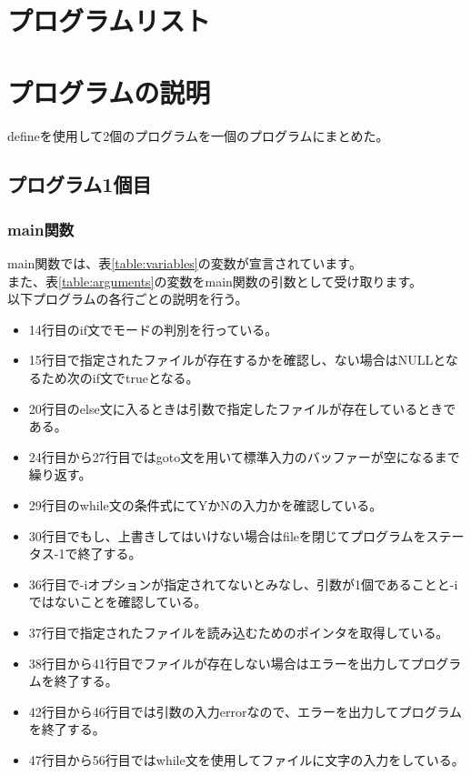 \documentclass[dvipdfmx]{jsarticle}
\begin{document}
\section{プログラムリスト}


\section{プログラムの説明}
defineを使用して2個のプログラムを一個のプログラムにまとめた。
\subsection{プログラム1個目}

\subsubsection{main関数}
main関数では、表\ref{table:variables}の変数が宣言されています。\\
また、表\ref{table:arguments}の変数をmain関数の引数として受け取ります。\\
以下プログラムの各行ごとの説明を行う。
\begin{itemize}
  \item 14行目のif文でモードの判別を行っている。
  \item 15行目で指定されたファイルが存在するかを確認し、ない場合はNULLとなるため次のif文でtrueとなる。
  \item 20行目のelse文に入るときは引数で指定したファイルが存在しているときである。
  \item 24行目から27行目ではgoto文を用いて標準入力のバッファーが空になるまで繰り返す。
  \item 29行目のwhile文の条件式にてYかNの入力かを確認している。
  \item 30行目でもし、上書きしてはいけない場合はfileを閉じてプログラムをステータス-1で終了する。
  \item 36行目で-iオプションが指定されてないとみなし、引数が1個であることと-iではないことを確認している。
  \item 37行目で指定されたファイルを読み込むためのポインタを取得している。
  \item 38行目から41行目でファイルが存在しない場合はエラーを出力してプログラムを終了する。
  \item 42行目から46行目では引数の入力errorなので、エラーを出力してプログラムを終了する。
  \item 47行目から56行目ではwhile文を使用してファイルに文字の入力をしている。
\end{itemize}
\end{document}
